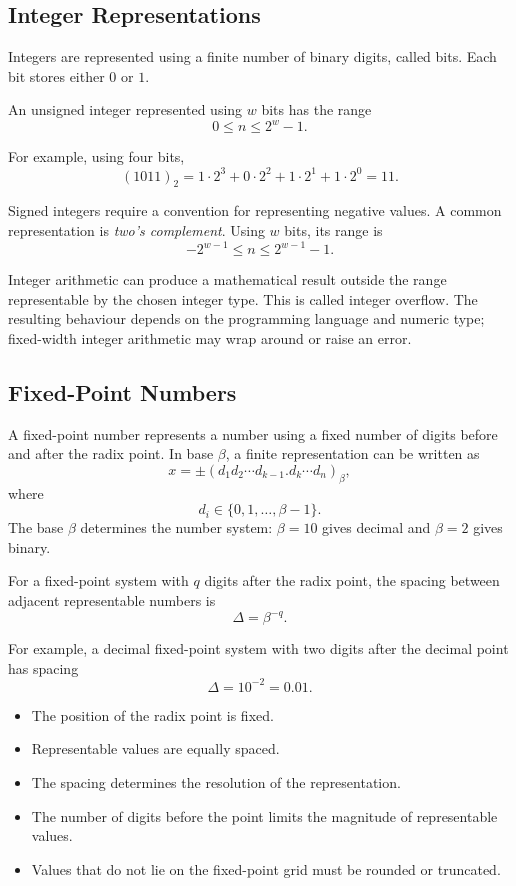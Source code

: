 \subsection{Integer Representations}

Integers are represented using a finite number of binary digits, called bits. Each bit stores either \(0\) or \(1\).

An unsigned integer represented using \(w\) bits has the range
\[
  \boxed{0\leq n\leq 2^w-1.}
\]

For example, using four bits,
\[
  (1011)_2=1\cdot2^3+0\cdot2^2+1\cdot2^1+1\cdot2^0=11.
\]

Signed integers require a convention for representing negative values. A common representation is \emph{two's complement}. Using \(w\) bits, its range is
\[
  \boxed{-2^{w-1}\leq n\leq 2^{w-1}-1.}
\]

\begin{remark}
  Integer arithmetic can produce a mathematical result outside the range representable by the chosen integer type. This is called integer overflow. The resulting behaviour depends on the programming language and numeric type; fixed-width integer arithmetic may wrap around or raise an error.
\end{remark}

\subsection{Fixed-Point Numbers}

\begin{definition}
  A fixed-point number represents a number using a fixed number of digits before and after the radix point. In base \(\beta\), a finite representation can be written as
  \[
    x=\pm(d_1d_2\cdots d_{k-1}.d_k\cdots d_n)_\beta,
  \]
  where
  \[
    d_i\in\{0,1,\ldots,\beta-1\}.
  \]
  The base \(\beta\) determines the number system: \(\beta=10\) gives decimal and \(\beta=2\) gives binary.
\end{definition}

For a fixed-point system with \(q\) digits after the radix point, the spacing between adjacent representable numbers is
\[
  \boxed{\Delta=\beta^{-q}.}
\]

For example, a decimal fixed-point system with two digits after the decimal point has spacing
\[
  \Delta=10^{-2}=0.01.
\]

\begin{remark}
  \begin{itemize} \emph{}
    \item The position of the radix point is fixed.
    \item Representable values are equally spaced.
    \item The spacing determines the resolution of the representation.
    \item The number of digits before the point limits the magnitude of representable values.
    \item Values that do not lie on the fixed-point grid must be rounded or truncated.
  \end{itemize}
\end{remark}

